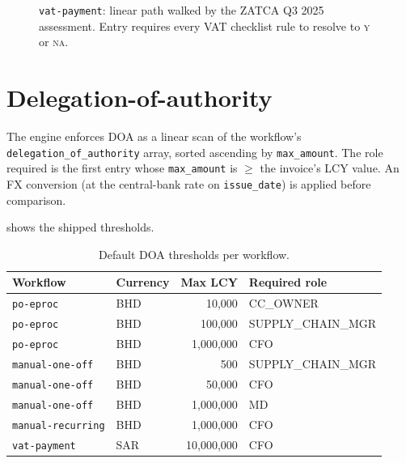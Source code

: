 \documentclass[11pt,a4paper,twoside]{report}
\begin{document}
\begin{figure}[htbp]
\centering
{}
\caption{\texttt{vat-payment}: linear path walked by the ZATCA Q3
2025 assessment. Entry requires every VAT checklist rule to resolve
to \textsc{y} or \textsc{na}.}
\label{fig:vat-payment}
\end{figure}

\section{Delegation-of-authority}

The engine enforces DOA as a linear scan of the workflow's
\texttt{delegation\_of\_authority} array, sorted ascending by
\texttt{max\_amount}. The role required is the first entry whose
\texttt{max\_amount} is $\geq$ the invoice's LCY value. An FX
conversion (at the central-bank rate on \texttt{issue\_date}) is
applied before comparison.

 shows the shipped thresholds.

\begin{table}[htbp]
\centering
\caption{Default DOA thresholds per workflow.}
\label{tab:doa}
\small
\begin{tabularx}{\linewidth}{@{}l l r l@{}}
\toprule
\textbf{Workflow} & \textbf{Currency} & \textbf{Max LCY} & \textbf{Required role} \\ \midrule
\texttt{po-eproc}        & BHD &    10{,}000 & CC\_OWNER \\
\texttt{po-eproc}        & BHD &   100{,}000 & SUPPLY\_CHAIN\_MGR \\
\texttt{po-eproc}        & BHD & 1{,}000{,}000 & CFO \\
\texttt{manual-one-off}  & BHD &      500 & SUPPLY\_CHAIN\_MGR \\
\texttt{manual-one-off}  & BHD &   50{,}000 & CFO \\
\texttt{manual-one-off}  & BHD & 1{,}000{,}000 & MD \\
\texttt{manual-recurring}& BHD & 1{,}000{,}000 & CFO \\
\texttt{vat-payment}     & SAR & 10{,}000{,}000 & CFO \\
\bottomrule
\end{tabularx}
\end{table}
\end{document}
